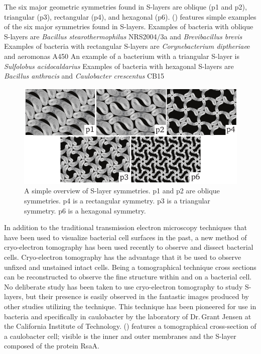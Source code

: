 The six major geometric symmetries found in
\acp{S-layer} are oblique (p1 and p2), triangular (p3), rectangular (p4), and hexagonal
(p6).  () features simple examples of the six major
symmetries found in \acp{S-layer}.  Examples of bacteria with oblique \acp{S-layer} are
\textit{Bacillus stearothermophilus} NRS2004$/$3a and
\textit{Brevibacillus brevis} Examples of bacteria with rectangular
\acp{S-layer} are \textit{Corynebacterium
  diptheriae}e and \ac{aeromonas}
A450 An example of a bacterium with a
triangular \ac{S-layer} is \textit{Sulfolobus acidocaldarius} Examples
of bacteria with hexagonal \acp{S-layer} are \textit{Bacillus anthracis}
and \textit{Caulobacter crescentus} CB15

\begin{figure}[htb] %
  \begin{center}
    \includegraphics[]{intro/img/symmetries.pdf}
  \end{center}
  \caption[A simple overview of \ac{S-layer} symmetries]{A simple overview of \ac{S-layer}
    symmetries. p1 and p2 are oblique symmetries.  p4 is a rectangular symmetry.  p3 is a triangular
    symmetry.  p6 is a hexagonal symmetry.}
  \label{fig:symmetries}
\end{figure}
   
In addition to the traditional transmission electron microscopy techniques that have been used to
visualize bacterial cell surfaces in the past, a new method of cryo-electron tomography has been
used recently to observe and dissect bacterial cells. Cryo-electron tomography has the advantage
that it be used to observe unfixed and unstained intact cells. Being a tomographical technique cross
sections can be reconstructed to observe the fine structure within and on a bacterial cell. No
deliberate study has been taken to use cryo-electron tomography to study \acp{S-layer}, but their
presence is easily observed in the fantastic images produced by other studies utilizing the
technique. This technique has been pioneered for use in bacteria and specifically in \ac{caulobacter} by the laboratory of Dr.\,Grant Jensen at the California Institute of Technology.  () features a tomographical cross-section of a \ac{caulobacter} cell; visible is the inner and outer membranes and the \ac{S-layer} composed of the protein RsaA.

